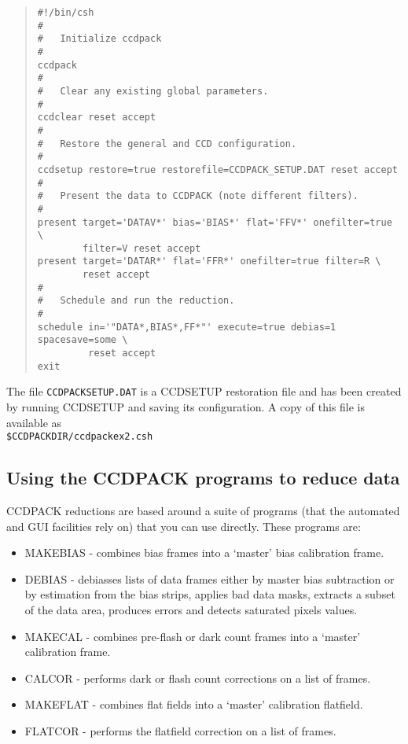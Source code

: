 \documentclass[twoside,11pt]{article}
\newcommand{\htmlref}[2]{#1}
\renewcommand{\_}{\texttt{\symbol{95}}}
\newenvironment{myquote}{\begin{quote}\begin{small}}{\end{small}\end{quote}}
\newcommand{\text}[1]{{\small \tt #1}}
\newcommand{\routine}[1]{{\sc #1}}
\newcommand{\xroutine}[1]{\htmlref{{\sc #1}}{#1}}
\begin{document}
\begin{center}
\end{center}
\begin{myquote}
\begin{verbatim}
#!/bin/csh
#
#   Initialize ccdpack
#
ccdpack
#
#   Clear any existing global parameters.
#
ccdclear reset accept
#
#   Restore the general and CCD configuration.
#
ccdsetup restore=true restorefile=CCDPACK_SETUP.DAT reset accept
#
#   Present the data to CCDPACK (note different filters).
#
present target='DATAV*' bias='BIAS*' flat='FFV*' onefilter=true \
        filter=V reset accept
present target='DATAR*' flat='FFR*' onefilter=true filter=R \
        reset accept
#
#   Schedule and run the reduction.
#
schedule in='"DATA*,BIAS*,FF*"' execute=true debias=1 spacesave=some \
         reset accept
exit
\end{verbatim}
\end{myquote}
The file \text{CCDPACK\_SETUP.DAT}
is a \xroutine{CCDSETUP} restoration file and has been created by
running \routine{CCDSETUP} and saving its configuration.
A copy of this file is available as \\
\text{\$CCDPACK\_DIR/ccdpack\_ex2.csh}

\subsection{Using the CCDPACK programs to reduce data}
CCDPACK reductions are based around a suite of programs (that the
automated and GUI facilities rely on) that you can use directly. These
programs are:
\begin{itemize}
\item \xroutine{MAKEBIAS} - combines bias frames into a `master' bias calibration
frame.
\item \xroutine{DEBIAS}   - debiasses lists of data frames either by master bias
subtraction or by estimation from the bias strips, applies bad data
masks, extracts a subset of the data area, produces errors and
detects saturated pixels values.
\item \xroutine{MAKECAL}  - combines pre-flash or dark count frames into a `master'
calibration frame.
\item \xroutine{CALCOR}   - performs dark or flash count corrections on a list of
frames.
\item \xroutine{MAKEFLAT} - combines flat fields into a `master' calibration
                 flatfield.
\item \xroutine{FLATCOR}  - performs the flatfield correction on a list of frames.
\end{itemize}
\end{document}
